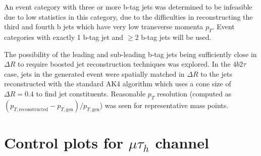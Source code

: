 An event category with three or more b-tag jets was determined to be infeasible due to low statistics in this category, due to the difficulties in reconstructing the third and fourth b jets which have very low transverse momenta $p_{T}$. Event categories with exactly 1 b-tag jet and $\geq 2$ b-tag jets will be used.

The possibility of the leading and sub-leading b-tag jets being sufficiently close in $\Delta R$ to require boosted jet reconstruction techniques was explored. In the $4b2\tau$ case, jets in the generated event were spatially matched in $\Delta R$ to the jets reconstructed with the standard AK4 algorithm which uses a cone size of $\Delta R = 0.4$ to find jet constituents. Reasonable $p_{T}$ resolution (computed as $(p_{T, \text{reconstructed}} - p_{T, \text{gen}})/ p_{T, \text{gen}}$) was seen for representative mass points.

\section{Control plots for $\mu\tau_{h}$ channel}
